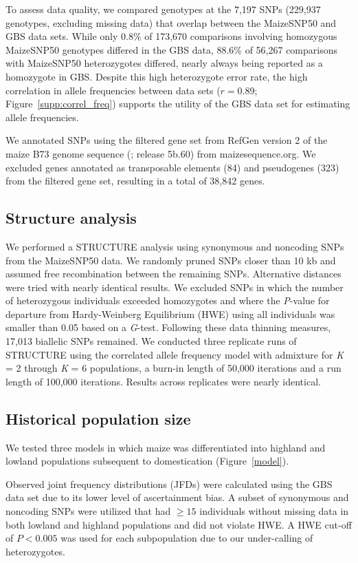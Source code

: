 To assess data quality, we compared genotypes at the 7,197 SNPs (229,937 genotypes, excluding missing data) that overlap between the MaizeSNP50 and GBS data sets. 
While only 0.8\% of 173,670  comparisons involving homozygous MaizeSNP50 genotypes differed in the GBS data, 88.6\% of 56,267 comparisons with MaizeSNP50 heterozygotes differed, nearly always being reported as a homozygote in GBS.
Despite this high heterozygote error rate,  the high correlation in allele frequencies between data sets ($r=0.89$; Figure~\ref{supp:correl_freq}) supports the utility of the GBS data set for estimating allele frequencies.  

We annotated SNPs using the filtered gene set from RefGen version 2 of the maize B73 genome sequence (\citealt{Schnable_2009_19965430}; release 5b.60) from maizesequence.org.  
We excluded genes annotated as transposable elements (84) and pseudogenes (323) from the filtered gene set, resulting in a total of 38,842 genes.

\subsection*{Structure analysis}
We performed a {\sf STRUCTURE} analysis \cite[]{Pritchard_2000_10835412,Falush_2003_12930761} using synonymous and noncoding SNPs from the MaizeSNP50 data. 
We randomly pruned SNPs closer than 10 kb and assumed free recombination between the remaining SNPs.
Alternative distances were tried with nearly identical results. 
We excluded SNPs in which the number of heterozygous individuals exceeded homozygotes and where the \emph{P}-value for departure from Hardy-Weinberg Equilibrium (HWE) using all individuals was smaller than 0.05 based on a \emph{G}-test. 
Following these data thinning measures, 17,013 biallelic SNPs remained. 
We conducted three replicate runs of {\sf STRUCTURE} using the correlated allele frequency model with admixture for \emph{K} = 2 through \emph{K} = 6 populations, a burn-in length of 50,000 iterations and a run length of 100,000 iterations. 
Results across replicates were nearly identical.

\subsection*{Historical population size}
We tested three models in which maize was differentiated into highland and lowland populations subsequent to domestication (Figure~\ref{model}). 

Observed joint frequency distributions (JFDs) were calculated using the GBS data set due to its lower level of ascertainment bias. 
A subset of synonymous and noncoding SNPs were utilized that had $\geq15$ individuals without missing data in both lowland and highland populations and did not violate HWE.  
A HWE cut-off of $P<0.005$ was used for each subpopulation due to our under-calling of heterozygotes. 

